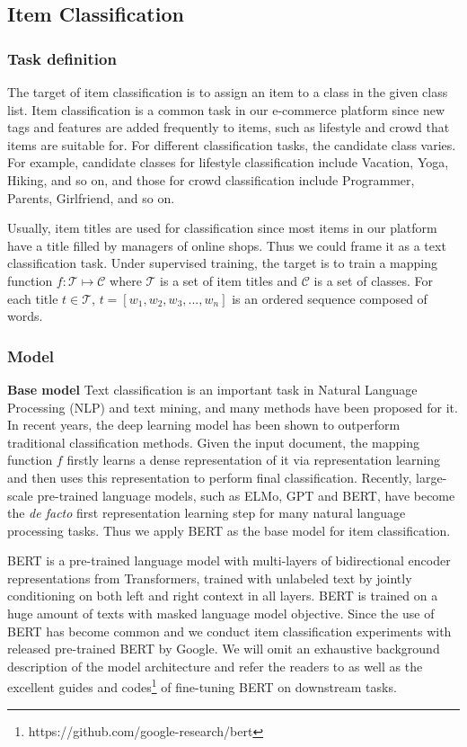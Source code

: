 \subsection{Item Classification}
\subsubsection{Task definition}
The target of item classification is to assign an item to a class in the given class list. Item classification is a common task in our e-commerce platform since new tags and features are added frequently to items, such as lifestyle and crowd that items are suitable for. For different classification tasks, the candidate class varies.  For example, candidate classes for lifestyle classification include Vacation, Yoga, Hiking, and so on, and those for crowd classification include Programmer, Parents, Girlfriend, and so on. 

Usually, item titles are used for classification since most items in our platform have a title filled by managers of online shops. Thus we could frame it as a text classification task. Under supervised training, the target is to train a mapping function $f: \mathcal{T} \mapsto \mathcal{C}$ where $\mathcal{T}$ is a set of item titles and $\mathcal{C}$ is a set of classes. For each title  $t \in \mathcal{T}$, $t = [ w_1, w_2, w_3, ..., w_n ]$ is an ordered sequence composed of words. 

\subsubsection{Model}

\textbf{Base model}
Text classification is an important task in Natural Language Processing (NLP) and text mining, and many methods have been proposed for it. In recent years, the deep learning model has been shown to outperform traditional classification methods\cite{DBLP:conf/acl/HenaoLCSSWWMZ18, BERT}. Given the input document, the mapping function $f$ firstly learns a dense representation of it via representation learning and then uses this representation to perform final classification. Recently, large-scale pre-trained language models, such as ELMo\cite{ELMo}, GPT\cite{GPT} and BERT\cite{BERT}, have become the \emph{de facto} first representation learning step for many natural language processing tasks. Thus we apply BERT as the base model for item classification. 

BERT is a pre-trained language model with multi-layers of bidirectional encoder representations from Transformers, trained with unlabeled text by jointly conditioning on both left and right context in all layers. BERT is trained on a huge amount of texts with masked language model objective. Since the use of BERT has become common and we conduct item classification experiments with released pre-trained BERT by Google. We will omit an exhaustive background description of the model architecture and refer the readers to \cite{BERT} as well as the excellent guides and codes\footnote{https://github.com/google-research/bert} of fine-tuning BERT on downstream tasks. 


